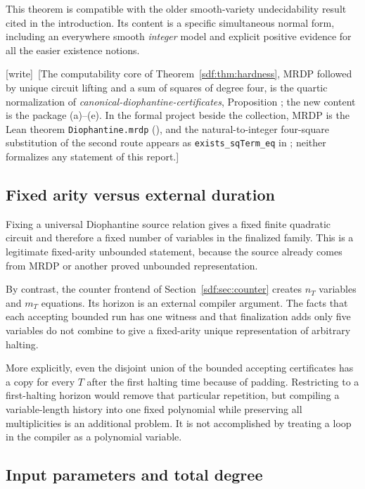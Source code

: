 \documentclass[11pt,a4paper]{article}
\theoremstyle{definition}
\theoremstyle{remark}
\newcommand{\wtag}{\textup{[write]}}
\begin{document}
This theorem is compatible with the older smooth-variety undecidability
result cited in the introduction. Its content is a specific simultaneous
normal form, including an everywhere smooth \emph{integer} model and
explicit positive evidence for all the easier existence notions.

\wtag\ [The computability core of Theorem~\ref{sdf:thm:hardness}, MRDP
followed by unique circuit lifting and a sum of squares of degree four, is
the quartic normalization of \emph{canonical-diophantine-certificates},
Proposition ; the new content is the package
(a)--(e). In the formal project beside the collection, MRDP is the Lean
theorem \texttt{Diophantine.mrdp}
(), and the
natural-to-integer four-square substitution of the second route appears as
\texttt{exists\_sqTerm\_eq} in
;
neither formalizes any statement of this report.]

\subsection{Fixed arity versus external duration}

Fixing a universal Diophantine source relation gives a fixed finite
quadratic circuit and therefore a fixed number of variables in the
finalized family. This is a legitimate fixed-arity unbounded statement,
because the source already comes from MRDP or another proved unbounded
representation.

By contrast, the counter frontend of Section~\ref{sdf:sec:counter} creates
$n_T$ variables and $m_T$ equations. Its horizon is an external compiler
argument. The facts that each accepting bounded run has one witness and
that finalization adds only five variables do not combine to give a
fixed-arity unique representation of arbitrary halting.

More explicitly, even the disjoint union of the bounded accepting
certificates has a copy for every $T$ after the first halting time because
of padding. Restricting to a first-halting horizon would remove that
particular repetition, but compiling a variable-length history into one
fixed polynomial while preserving all multiplicities is an additional
problem. It is not accomplished by treating a loop in the compiler as a
polynomial variable.

\subsection{Input parameters and total degree}\label{sdf:sec:parameter-degree}
\end{document}
